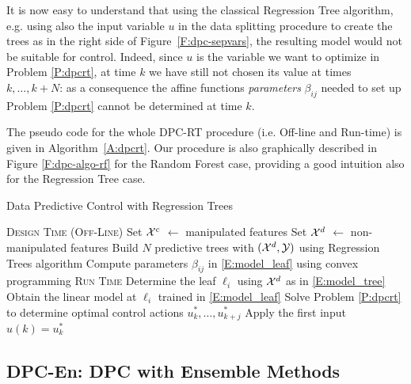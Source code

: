 \textcolor[rgb]{0,0,1}{\begin{remark}
It is now easy to understand that using the classical Regression Tree algorithm, e.g. using also the input variable $u$ in the data splitting procedure to create the trees as in the right side of Figure~\ref{F:dpc-sepvars}, the resulting model would not be suitable for control. Indeed, since $u$ is the variable we want to optimize in Problem \ref{P:dpcrt}, at time $k$ we have still not chosen its value at times $k, \ldots, k+N$: as a consequence the affine functions \emph{parameters }$\beta_{ij}$ needed to set up Problem \ref{P:dpcrt} cannot be determined at time $k$.
\end{remark}}


\textcolor[rgb]{0,0,1}{The pseudo code for the whole DPC-RT procedure (i.e. Off-line and Run-time) is given in Algorithm~\ref{A:dpcrt}. Our procedure is also graphically described in Figure \ref{F:dpc-algo-rf} for the Random Forest case, providing a good intuition also for the Regression Tree case.}


\textcolor[rgb]{0,0,1}{\begin{algorithm}[ht!]
	\caption{Data Predictive Control with Regression Trees}
	\label{A:dpcrt}
	\begin{algorithmic}[1]
		\State \textsc{Design Time (Off-Line)}
		\State Set $\mathcal{X}^c$ $\gets$ manipulated features
		\State Set $\mathcal{X}^d$ $\gets$ non-manipulated features
		\State Build $N$ predictive trees with $(\mathcal{X}^d,\mathcal{Y})$ using Regression Trees algorithm
		\State Compute parameters $\beta_{ij}$ in \eqref{E:model_leaf} using convex programming
		\EndFor
		\EndFor
		\EndProcedure
		\State \textsc{Run Time}
		\State Determine the leaf $\ell_i$ using $\mathcal{X}^d$ as in \eqref{E:model_tree}
		\State Obtain the linear model at $\ell_i$ trained in \eqref{E:model_leaf}
		\EndFor
		\State Solve Problem \ref{P:dpcrt} to determine optimal
		\State control actions $u^*_k,\ldots,u^*_{k+j}$
		\State Apply the first input $u(k)=u^*_k$
		\EndWhile
		\EndProcedure
	\end{algorithmic}
\end{algorithm}}




\subsection{DPC-En: DPC with Ensemble Methods}


